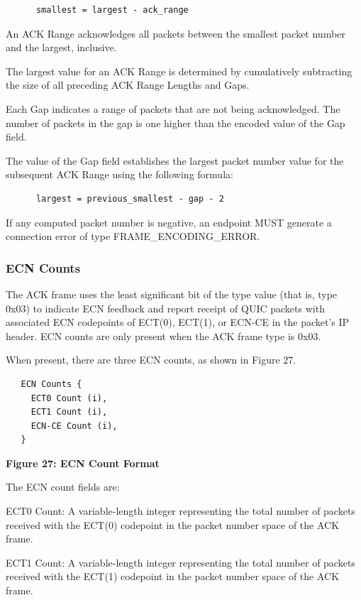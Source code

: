 \documentclass{article}
\begin{document}
\begin{verbatim}
      smallest = largest - ack_range
\end{verbatim}

An ACK Range acknowledges all packets between the smallest packet number and the largest, inclusive.

The largest value for an ACK Range is determined by cumulatively subtracting the size of all preceding ACK Range Lengths and Gaps.

Each Gap indicates a range of packets that are not being acknowledged.  The number of packets in the gap is one higher than the encoded value of the Gap field.

The value of the Gap field establishes the largest packet number value for the subsequent ACK Range using the following formula:

\begin{verbatim}
      largest = previous_smallest - gap - 2
\end{verbatim}

If any computed packet number is negative, an endpoint MUST generate a connection error of type FRAME\_ENCODING\_ERROR.

\subsubsection{ECN Counts}

The ACK frame uses the least significant bit of the type value (that is, type 0x03) to indicate ECN feedback and report receipt of QUIC packets with associated ECN codepoints of ECT(0), ECT(1), or ECN-CE in the packet's IP header.  ECN counts are only present when the ACK frame type is 0x03.

When present, there are three ECN counts, as shown in Figure 27.

\begin{verbatim}
   ECN Counts {
     ECT0 Count (i),
     ECT1 Count (i),
     ECN-CE Count (i),
   }
\end{verbatim}

\begin{center}
\textbf{Figure 27: ECN Count Format}
\end{center}

The ECN count fields are:

ECT0 Count:  A variable-length integer representing the total number of packets received with the ECT(0) codepoint in the packet number space of the ACK frame.

ECT1 Count:  A variable-length integer representing the total number of packets received with the ECT(1) codepoint in the packet number space of the ACK frame.
\end{document}
